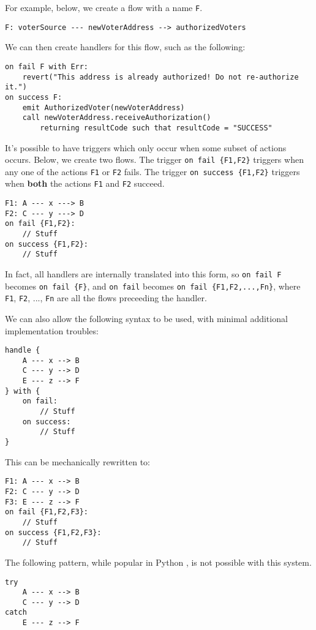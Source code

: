 \documentclass[10pt]{article}
\begin{document}
For example, below, we create a flow with a name \lstinline{F}.
\begin{lstlisting}
F: voterSource --- newVoterAddress --> authorizedVoters
\end{lstlisting}

We can then create handlers for this flow, such as the following:
\begin{lstlisting}
on fail F with Err:
    revert("This address is already authorized! Do not re-authorize it.")
on success F:
    emit AuthorizedVoter(newVoterAddress)
    call newVoterAddress.receiveAuthorization()
        returning resultCode such that resultCode = "SUCCESS"
\end{lstlisting}

It's possible to have triggers which only occur when some subset of actions occurs.
Below, we create two flows.
The trigger \lstinline|on fail {F1,F2}| triggers when any one of the actions \lstinline{F1} or \lstinline{F2} fails.
The trigger \lstinline|on success {F1,F2}| triggers when \textbf{both} the actions \lstinline{F1} and \lstinline{F2} succeed.
\begin{lstlisting}
F1: A --- x ---> B
F2: C --- y ---> D
on fail {F1,F2}:
    // Stuff
on success {F1,F2}:
    // Stuff
\end{lstlisting}

In fact, all handlers are internally translated into this form, so \lstinline{on fail F} becomes \lstinline|on fail {F}|, and \lstinline{on fail} becomes \lstinline|on fail {F1,F2,...,Fn}|, where \lstinline{F1}, \lstinline{F2}, ..., \lstinline{Fn} are all the flows preceeding the handler.

We can also allow the following syntax to be used, with minimal additional implementation troubles:
\begin{lstlisting}
handle {
    A --- x --> B
    C --- y --> D
    E --- z --> F
} with {
    on fail:
        // Stuff
    on success:
        // Stuff
}
\end{lstlisting}

This can be mechanically rewritten to:
\begin{lstlisting}
F1: A --- x --> B
F2: C --- y --> D
F3: E --- z --> F
on fail {F1,F2,F3}:
    // Stuff
on success {F1,F2,F3}:
    // Stuff
\end{lstlisting}

The following pattern, while popular in Python , is not possible with this system.
\begin{lstlisting}
try
    A --- x --> B
    C --- y --> D
catch
    E --- z --> F
\end{lstlisting}
\end{document}
